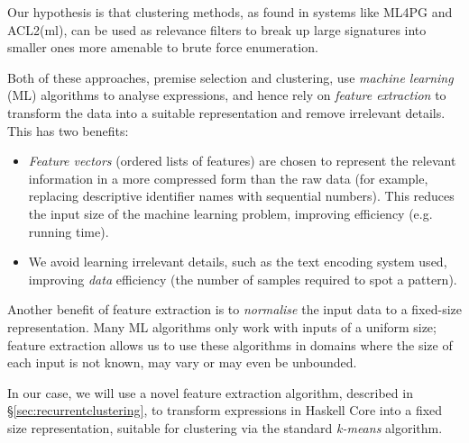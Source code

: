 Our hypothesis is that clustering methods, as found in systems like ML4PG and ACL2(ml), can be used as relevance filters to break up large signatures into smaller ones more amenable to brute force enumeration.

\iffalse TODO: I would play up the clustering intelligence. Clustering is not just about breaking up, it is about discovering significant patterns in data. By forgetting this, you make motivation for your work sound too ``small'' \fi

Both of these approaches, premise selection and clustering, use \emph{machine learning} (ML) algorithms to analyse expressions, and hence rely on \emph{feature extraction} to transform the data into a suitable representation and remove irrelevant details. This has two benefits:

\begin{itemize}
  \item \emph{Feature vectors} (ordered lists of features) are chosen to represent the relevant information in a more compressed form than the raw data (for example, replacing descriptive identifier names with sequential numbers). This reduces the input size of the machine learning problem, improving efficiency (e.g. running time).
  \item We avoid learning irrelevant details, such as the text encoding system used, improving \emph{data} efficiency (the number of samples required to spot a pattern).
\end{itemize}

Another benefit of feature extraction is to \emph{normalise} the input data to a fixed-size representation. Many ML algorithms only work with inputs of a uniform size; feature extraction allows us to use these algorithms in domains where the size of each input is not known, may vary or may even be unbounded.

In our case, we will use a novel feature extraction algorithm, described in \S \ref{sec:recurrentclustering}, to transform expressions in Haskell Core into a fixed size representation, suitable for clustering via the standard \emph{k-means} algorithm.

\iffalse TODO: I have had a look now at section 5. I do not think feature extraction and clustering is explained/defined there, either. Seeing your contribution is feature extraction algorithms, you need to define feature vectors and clusters *here* \fi

\iffalse


